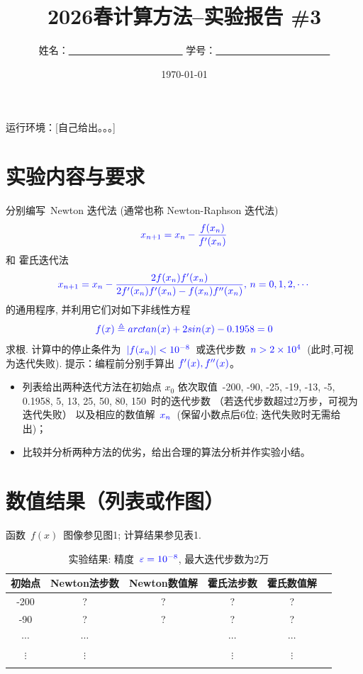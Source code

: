 \documentclass[UTF8]{ctexart}
\title{\bf 2026春计算方法--实验报告 \#3}
\author{姓名：\underline{~~~~~~~~~~~~~~~~~~~~~~~}  学号：\underline{~~~~~~~~~~~~~~~~~~~~~~~} }
\date{\today}
\begin{document}
\maketitle

运行环境：[自己给出。。。]

\section*{实验内容与要求}

分别编写~Newton 迭代法 (通常也称 Newton-Raphson 迭代法)
$$\color{blue}x_{n+1}=x_n-\frac{f(x_n)}{f'(x_n)}$$
和 %
霍氏迭代法
 $$\color{blue}x_{n+1}= x_n - \frac{2f(x_n)f'(x_n)}{2f'(x_n)f'(x_n) - f(x_n)f''(x_n)}, \, n=0,1,2,\cdots$$
的通用程序, 并利用它们对如下非线性方程
$$\color{blue}f(x)\triangleq{arctan(x)}+2sin(x) - 0.1958 =0$$
求根. %
计算中的停止条件为~$\color{blue}|f(x_n)|<10^{-8}$~或迭代步数~$\color{blue}n>2\times 10^4$~(此时,可视为迭代失败).
提示：编程前分别手算出$\color{blue}~f'(x), f''(x)$。

\begin{itemize}
    \item 列表给出两种迭代方法在初始点 $x_0$ 依次取值~-200, -90, -25, -19, -13, -5, 0.1958, 5, 13, 25, 50, 80, 150~时的迭代步数
    （若迭代步数超过2万步，可视为迭代失败）
    以及相应的数值解~$\color{blue}x_n$~({\color{blue}保留小数点后6位}; 迭代失败时无需给出)；
    \item 比较并分析两种方法的优劣，给出合理的算法分析并作实验小结。
\end{itemize}
\clearpage

\section{数值结果（列表或作图）}
函数~$f(x)$~图像参见图1; 计算结果参见表1.
\begin{table}[htb]
\centering
\caption{实验结果: 精度~$\color{blue}\varepsilon = 10^{-8}$, 最大迭代步数为2万}
\begin{tabular}{cccccc}
\hline
初始点 & Newton法步数 & Newton数值解 & 霍氏法步数 & 霍氏数值解 \\
\hline
-200 & ? & ?& ? & ?   \\
-90 & ? & ? &? & ?  \\
$\cdots$  & $\cdots$ & &  $\cdots$ & $\cdots$  \\
$\vdots$  & $\vdots$ & & $\vdots$ & $\vdots$ \\
  &   &  &  &   \\
\hline
\end{tabular}
\end{table}
\end{document}
